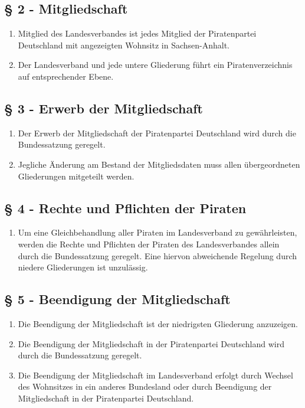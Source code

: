 \documentclass[draft,a4paper,10pt]{article}
\begin{document}
\subsection{§ 2 - Mitgliedschaft}
\begin{enumerate}
\item Mitglied des Landesverbandes ist jedes Mitglied der Piratenpartei
Deutschland mit angezeigten Wohnsitz in Sachsen-Anhalt.

\item Der Landesverband und jede untere Gliederung führt ein Piratenverzeichnis
auf entsprechender Ebene.
\end{enumerate}

\subsection{§ 3 - Erwerb der Mitgliedschaft}
\begin{enumerate}
\item Der Erwerb der Mitgliedschaft der Piratenpartei Deutschland wird durch die
Bundessatzung geregelt.

\item Jegliche Änderung am Bestand der Mitgliedsdaten muss allen übergeordneten
Gliederungen mitgeteilt werden.
\end{enumerate}

\subsection{§ 4 - Rechte und Pflichten der Piraten}
\begin{enumerate}
\item Um eine Gleichbehandlung aller Piraten im Landesverband zu gewährleisten,
werden die Rechte und Pflichten der Piraten des Landesverbandes allein durch die
Bundessatzung geregelt. Eine hiervon abweichende Regelung durch niedere
Gliederungen ist unzulässig.
\end{enumerate}

\subsection{§ 5 - Beendigung der Mitgliedschaft}
\begin{enumerate}
\item Die Beendigung der Mitgliedschaft ist der niedrigsten Gliederung anzuzeigen.

\item Die Beendigung der Mitgliedschaft in der Piratenpartei Deutschland wird
durch die Bundessatzung geregelt.

\item Die Beendigung der Mitgliedschaft im Landesverband erfolgt durch Wechsel
des Wohnsitzes in ein anderes Bundesland oder durch Beendigung der
Mitgliedschaft in der Piratenpartei Deutschland.
\end{enumerate}
\end{document}

